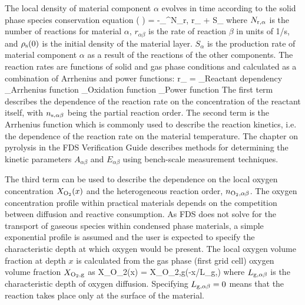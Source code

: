 The local density of material component $\alpha$ evolves in time according to the solid phase species conservation equation
\be
   \left(  \right) =
    -\sum_{}^{N_{\rm r,\alpha}} r_{\alpha \beta} + S_\alpha
  \label{solid_species_conservation}
\ee
where $N_{\rm r,\alpha}$ is the number of reactions for material $\alpha$, $r_{\alpha \beta}$ is the rate of reaction $\beta$ in units of \si{1/s},
and $\rho_{\rm s}(0)$ is the initial density of the material layer. $S_\alpha$ is the production rate of material component $\alpha$ as a result of
the reactions of the other components. The reaction rates are functions of solid and gas phase conditions and calculated as a combination of Arrhenius
and power functions:
\be
r_{\alpha \beta} =
    _\textrm{Reactant dependency}
    _\textrm{Arrhenius function}
    _\textrm{Oxidation function}
    _\textrm{Power function}
   \label{Arrhenius}
\ee
The first term describes the dependence of the reaction rate on the concentration of the reactant itself, with $n_{\rm s,\alpha\beta}$ being the partial
reaction order. The second term is the Arrhenius function which is commonly used to describe the reaction kinetics, i.e. the dependence of the reaction
rate on the material temperature. The chapter on pyrolysis in the FDS Verification Guide describes methods for determining the kinetic parameters
$A_{\alpha \beta}$ and $E_{\alpha\beta}$ using bench-scale measurement techniques.

The third term can be used to describe the dependence on the
local oxygen concentration $X_{\rm O_2}(x)$ and the heterogeneous reaction order, $n_{\rm O_2,\alpha\beta}$.
The oxygen concentration profile within practical materials depends on the competition between diffusion and reactive consumption.
As FDS does not solve for the transport of gaseous species within condensed phase materials, a simple exponential profile is assumed and the
user is expected to specify the characteristic depth at which oxygen would be present.
The local oxygen volume fraction at depth $x$ is calculated from the gas phase (first grid cell) oxygen volume fraction $X_{\rm O_2,g}$ as
\be
X_{\rm O_2}(x) = X_{\rm O_2,g}\exp(-x/L_{\rm g,\alpha\beta})
\ee
where $L_{\rm g,\alpha\beta}$ is the characteristic depth of oxygen diffusion. Specifying $L_{\rm g,\alpha\beta}=0$ means that the reaction takes place
only at the surface of the material.

